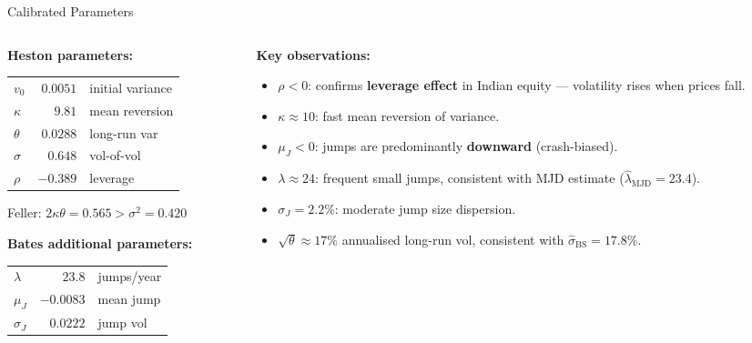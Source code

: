 \documentclass[10pt, aspectratio=169]{beamer}
\begin{document}
\begin{frame}{Calibrated Parameters}
\begin{columns}[T]
\begin{column}{0.48\textwidth}
\textbf{Heston parameters:}
\begin{center}
\small
\begin{tabular}{lrl}
\toprule
$v_0$ & $0.0051$ & initial variance \\
$\kappa$ & $9.81$ & mean reversion \\
$\theta$ & $0.0288$ & long-run var \\
$\sigma$ & $0.648$ & vol-of-vol \\
$\rho$ & $-0.389$ & leverage \\
\bottomrule
\end{tabular}
\end{center}
Feller: $2\kappa\theta = 0.565 > \sigma^2 = 0.420$ \; \textcolor{green!60!black}{\checkmark}

\vspace{4pt}
\textbf{Bates additional parameters:}
\begin{center}
\small
\begin{tabular}{lrl}
\toprule
$\lambda$ & $23.8$ & jumps/year \\
$\mu_J$ & $-0.0083$ & mean jump \\
$\sigma_J$ & $0.0222$ & jump vol \\
\bottomrule
\end{tabular}
\end{center}
\end{column}
\begin{column}{0.48\textwidth}
\textbf{Key observations:}
\begin{itemize}\setlength\itemsep{3pt}
  \item $\rho < 0$: confirms \textbf{leverage effect} in Indian equity --- volatility rises when prices fall.
  \item $\kappa \approx 10$: fast mean reversion of variance.
  \item $\mu_J < 0$: jumps are predominantly \textbf{downward} (crash-biased).
  \item $\lambda \approx 24$: frequent small jumps, consistent with MJD estimate ($\hat\lambda_{\text{MJD}} = 23.4$).
  \item $\sigma_J = 2.2\%$: moderate jump size dispersion.
  \item $\sqrt{\theta} \approx 17\%$ annualised long-run vol, consistent with $\hat\sigma_{\text{BS}} = 17.8\%$.
\end{itemize}
\end{column}
\end{columns}
\end{frame}
\end{document}
